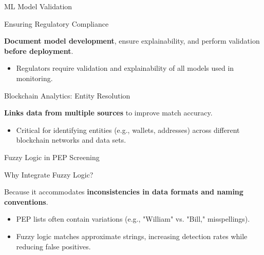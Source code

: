\documentclass{beamer}
\begin{document}
	\begin{frame}{ML Model Validation}
		\begin{block}{Ensuring Regulatory Compliance}
			\begin{center}
				\textbf{Document model development}, ensure explainability, and perform validation \textbf{before deployment}.
			\end{center}
		\end{block}
		\begin{itemize}
			\item Regulators require validation and explainability of all models used in monitoring.
		\end{itemize}
	\end{frame}
	
	\begin{frame}{Blockchain Analytics: Entity Resolution}
		\begin{definition}
			\textbf{Links data from multiple sources} to improve match accuracy.
		\end{definition}
		\begin{itemize}
			\item Critical for identifying entities (e.g., wallets, addresses) across different blockchain networks and data sets.
		\end{itemize}
	\end{frame}
	
	\begin{frame}{Fuzzy Logic in PEP Screening}
		\begin{block}{Why Integrate Fuzzy Logic?}
			\begin{center}
				Because it accommodates \textbf{inconsistencies in data formats and naming conventions}.
			\end{center}
		\end{block}
		\begin{itemize}
			\item PEP lists often contain variations (e.g., "William" vs. "Bill," misspellings).
			\item Fuzzy logic matches approximate strings, increasing detection rates while reducing false positives.
		\end{itemize}
	\end{frame}
	
\end{document}

